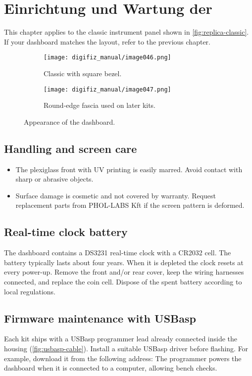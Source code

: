 \chapter{Einrichtung und Wartung der \ReplicaGenOne{}}\label{ch:replica-setup}

This chapter applies to the classic \ReplicaGenOne{} instrument panel shown in \autoref{fig:replica-classic}. If your dashboard matches the \ReplicaNextLong{} layout, refer to the previous chapter.

\begin{figure}[htbp]
    \centering
    \begin{subfigure}{0.46\textwidth}
        \texttt{[image: digifiz\_manual/image046.png]}
        \caption{Classic \ReplicaGenOne{} with square bezel.}
    \end{subfigure}\hfill
    \begin{subfigure}{0.46\textwidth}
        \texttt{[image: digifiz\_manual/image047.png]}
        \caption{Round-edge fascia used on later kits.}
    \end{subfigure}
    \caption{Appearance of the \ReplicaGenOne{} dashboard.}
    \label{fig:replica-classic}
\end{figure}

\section{Handling and screen care}
\begin{itemize}
    \item The plexiglass front with UV printing is easily marred. Avoid contact with sharp or abrasive objects.
    \item Surface damage is cosmetic and not covered by warranty. Request replacement parts from PHOL-LABS Kft if the screen pattern is deformed.
\end{itemize}

\section{Real-time clock battery}
The dashboard contains a DS3231 real-time clock with a CR2032 cell. The battery typically lasts about four years. When it is depleted the clock resets at every power-up. Remove the front and/or rear cover, keep the wiring harnesses connected, and replace the coin cell. Dispose of the spent battery according to local regulations.

\section{Firmware maintenance with USBasp}
Each kit ships with a USBasp programmer lead already connected inside the housing (\autoref{fig:usbasp-cable}). Install a suitable USBasp driver before flashing. For example, download it from the following address:
The programmer powers the dashboard when it is connected to a computer, allowing bench checks.

